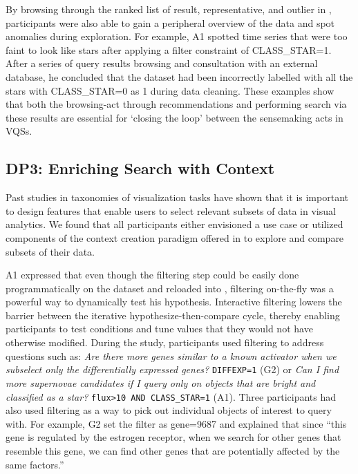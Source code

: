\par By browsing through the ranked list of result, representative, and outlier in \zv, participants were also able to gain a peripheral overview of the data and spot anomalies during exploration. For example, A1 spotted time series that were too faint to look like stars after applying a filter constraint of CLASS\_STAR=1. After a series of query results browsing and consultation with an external database, he concluded that the dataset had been incorrectly labelled with all the stars with CLASS\_STAR=0 as 1 during data cleaning. These examples show that both the browsing-act through recommendations and performing search via these results are essential for `closing the loop' between the sensemaking acts in VQSs. 
\subsection{DP3: Enriching Search with Context}
\par Past studies in taxonomies of visualization tasks have shown that it is important to design features that enable users to select relevant subsets of data in visual analytics\cite{Amar2005,Heer2012}. %
We found that all participants either envisioned a use case or utilized components of the context creation paradigm offered in \zv to explore and compare subsets of their data.
\par A1 expressed that even though the filtering step could be easily done programmatically on the dataset and reloaded into \zv, filtering on-the-fly was a powerful way to dynamically test his hypothesis. Interactive filtering lowers the barrier between the iterative hypothesize-then-compare cycle, thereby enabling participants to test conditions and tune values that they would not have otherwise modified.
During the study, participants used filtering to address questions such as: \textit{Are there more genes similar to a known activator when we subselect only the differentially expressed genes?} \texttt{DIFFEXP=1} (G2) or \textit{Can I find more supernovae candidates if I query only on objects that are bright and classified as a star?} \texttt{flux\textgreater10 AND CLASS\_STAR=1} (A1). Three participants had also used filtering as a way to pick out individual objects of interest to query with. For example, G2 set the filter as gene=9687 and explained that since ``this gene is regulated by the estrogen receptor, when we search for other genes that resemble this gene, we can find other genes that are potentially affected by the same factors.''
